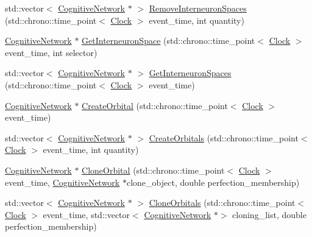 \begin{DoxyCompactItemize}
\item 
std\+::vector$<$ \mbox{\hyperlink{classCognitiveNetwork}{Cognitive\+Network}} $\ast$ $>$ \mbox{\hyperlink{classCognitiveNetwork_a994c5f93447a82429809c89aa08d3dc1}{Remove\+Interneuron\+Spaces}} (std\+::chrono\+::time\+\_\+point$<$ \mbox{\hyperlink{universe_8h_a0ef8d951d1ca5ab3cfaf7ab4c7a6fd80}{Clock}} $>$ event\+\_\+time, int quantity)
\item 
\mbox{\hyperlink{classCognitiveNetwork}{Cognitive\+Network}} $\ast$ \mbox{\hyperlink{classCognitiveNetwork_a0119d61e86ea6b84ad7f69f88d59d008}{Get\+Interneuron\+Space}} (std\+::chrono\+::time\+\_\+point$<$ \mbox{\hyperlink{universe_8h_a0ef8d951d1ca5ab3cfaf7ab4c7a6fd80}{Clock}} $>$ event\+\_\+time, int selector)
\item 
std\+::vector$<$ \mbox{\hyperlink{classCognitiveNetwork}{Cognitive\+Network}} $\ast$ $>$ \mbox{\hyperlink{classCognitiveNetwork_a4daf966882d527b784bd359794ad39ca}{Get\+Interneuron\+Spaces}} (std\+::chrono\+::time\+\_\+point$<$ \mbox{\hyperlink{universe_8h_a0ef8d951d1ca5ab3cfaf7ab4c7a6fd80}{Clock}} $>$ event\+\_\+time)
\item 
\mbox{\hyperlink{classCognitiveNetwork}{Cognitive\+Network}} $\ast$ \mbox{\hyperlink{classCognitiveNetwork_a5e0a782afc45d75d57fef91dd5513546}{Create\+Orbital}} (std\+::chrono\+::time\+\_\+point$<$ \mbox{\hyperlink{universe_8h_a0ef8d951d1ca5ab3cfaf7ab4c7a6fd80}{Clock}} $>$ event\+\_\+time)
\item 
std\+::vector$<$ \mbox{\hyperlink{classCognitiveNetwork}{Cognitive\+Network}} $\ast$ $>$ \mbox{\hyperlink{classCognitiveNetwork_a46d4189cf3e6b9af6190abe7b79539b4}{Create\+Orbitals}} (std\+::chrono\+::time\+\_\+point$<$ \mbox{\hyperlink{universe_8h_a0ef8d951d1ca5ab3cfaf7ab4c7a6fd80}{Clock}} $>$ event\+\_\+time, int quantity)
\item 
\mbox{\hyperlink{classCognitiveNetwork}{Cognitive\+Network}} $\ast$ \mbox{\hyperlink{classCognitiveNetwork_aa8992740f25d46b0be3d9d8344c39f67}{Clone\+Orbital}} (std\+::chrono\+::time\+\_\+point$<$ \mbox{\hyperlink{universe_8h_a0ef8d951d1ca5ab3cfaf7ab4c7a6fd80}{Clock}} $>$ event\+\_\+time, \mbox{\hyperlink{classCognitiveNetwork}{Cognitive\+Network}} $\ast$clone\+\_\+object, double perfection\+\_\+membership)
\item 
std\+::vector$<$ \mbox{\hyperlink{classCognitiveNetwork}{Cognitive\+Network}} $\ast$ $>$ \mbox{\hyperlink{classCognitiveNetwork_a266b7baf2fd9d6b5c5652e251830020a}{Clone\+Orbitals}} (std\+::chrono\+::time\+\_\+point$<$ \mbox{\hyperlink{universe_8h_a0ef8d951d1ca5ab3cfaf7ab4c7a6fd80}{Clock}} $>$ event\+\_\+time, std\+::vector$<$ \mbox{\hyperlink{classCognitiveNetwork}{Cognitive\+Network}} $\ast$$>$ cloning\+\_\+list, double perfection\+\_\+membership)
$$
\end{DoxyCompactItemize}
